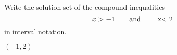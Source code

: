 
Write the solution set of the compound inequalities
\[x>-1\text{\quad\quad and \quad\quad x< 2} \]
in interval notation.

\begin{solution}
$(-1, 2)$
\end{solution}
